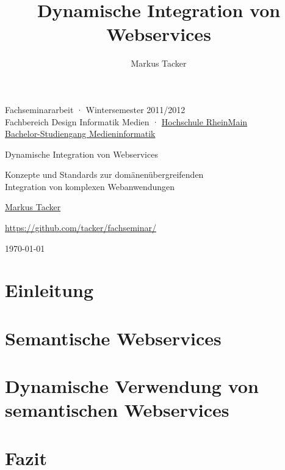 \documentclass[10pt,a4paper]{article}
\begin{document}
\author{Markus Tacker}
\title{Dynamische Integration von Webservices}

\begin{center}

\begin{small}Fachseminararbeit · Wintersemester 2011/2012\\Fachbereich Design Informatik Medien · \href{http://www.hs-rm.de/}{Hochschule RheinMain}\\\href{http://www.hs-rm.de/medieninformatik}{Bachelor-Studiengang Medieninformatik}\end{small}

\bigskip

\begin{huge}Dynamische Integration von Webservices\end{huge}

\begin{small}Konzepte und Standards zur domänenübergreifenden\\Integration von komplexen Webanwendungen\end{small}

\bigskip

\begin{large}\href{http://markusstudiert.de/}{Markus Tacker}\end{large}

\begin{small}\url{https://github.com/tacker/fachseminar/}\end{small}

\today

\end{center}



\section{Einleitung}
\label{l:einleitung}


\section{Semantische Webservices}
\label{l:sem-web-ser}


\section{Dynamische Verwendung von semantischen Webservices}
\label{l:loesungen}


\section{Fazit}
\label{l:fazit}



\end{document}
